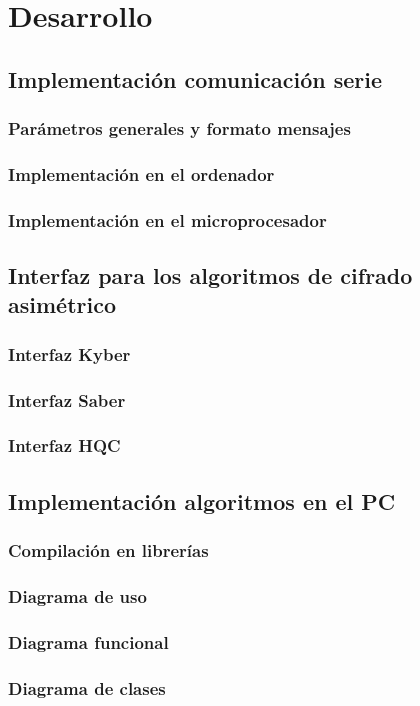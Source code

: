 \chapter{Desarrollo}
\section{Implementación comunicación serie}
\subsection{Parámetros generales y formato mensajes}
\subsection{Implementación en el ordenador}
\subsection{Implementación en el microprocesador}
\section{Interfaz para los algoritmos de cifrado asimétrico}
\subsection{Interfaz Kyber}
\subsection{Interfaz Saber}
\subsection{Interfaz HQC}
\section{Implementación algoritmos en el PC}
\subsection{Compilación en librerías}
\subsection{Diagrama de uso}
\subsection{Diagrama funcional}
\subsection{Diagrama de clases}
